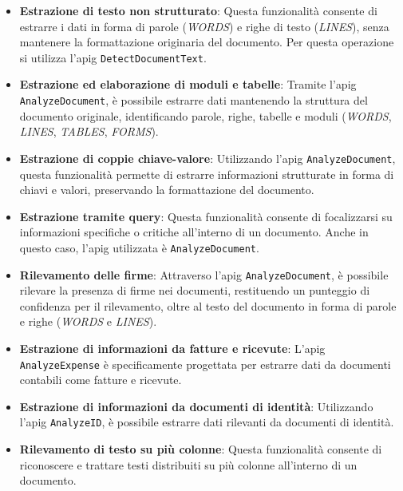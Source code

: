 \begin{itemize}
    \item \textbf{Estrazione di testo non strutturato}: Questa funzionalità consente di estrarre i dati in forma di parole (\textit{WORDS}) e righe di testo (\textit{LINES}), senza mantenere la formattazione originaria del documento. Per questa operazione si utilizza l'\gls{apig} \texttt{DetectDocumentText}.
    
    \item \textbf{Estrazione ed elaborazione di moduli e tabelle}: Tramite l'\gls{apig} \texttt{AnalyzeDocument}, è possibile estrarre dati mantenendo la struttura del documento originale, identificando parole, righe, tabelle e moduli (\textit{WORDS}, \textit{LINES}, \textit{TABLES}, \textit{FORMS}).
    
    \item \textbf{Estrazione di coppie chiave-valore}: Utilizzando l'\gls{apig} \texttt{AnalyzeDocument}, questa funzionalità permette di estrarre informazioni strutturate in forma di chiavi e valori, preservando la formattazione del documento.
    
    \item \textbf{Estrazione tramite query}: Questa funzionalità consente di focalizzarsi su informazioni specifiche o critiche all'interno di un documento. Anche in questo caso, l'\gls{apig} utilizzata è \texttt{AnalyzeDocument}.
    
    \item \textbf{Rilevamento delle firme}: Attraverso l'\gls{apig} \texttt{AnalyzeDocument}, è possibile rilevare la presenza di firme nei documenti, restituendo un punteggio di confidenza per il rilevamento, oltre al testo del documento in forma di parole e righe (\textit{WORDS} e \textit{LINES}).
    
    \item \textbf{Estrazione di informazioni da fatture e ricevute}: L'\gls{apig} \texttt{AnalyzeExpense} è specificamente progettata per estrarre dati da documenti contabili come fatture e ricevute.
    
    \item \textbf{Estrazione di informazioni da documenti di identità}: Utilizzando l'\gls{apig} \texttt{AnalyzeID}, è possibile estrarre dati rilevanti da documenti di identità.
    
    \item \textbf{Rilevamento di testo su più colonne}: Questa funzionalità consente di riconoscere e trattare testi distribuiti su più colonne all'interno di un documento.
\end{itemize}

